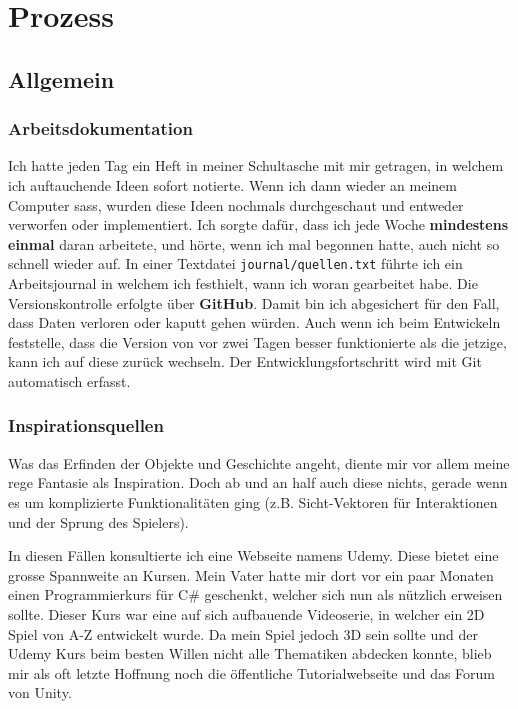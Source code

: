 \chapter{Prozess}

\section{Allgemein}

\subsection{Arbeitsdokumentation} 

Ich hatte jeden Tag ein Heft in meiner Schultasche mit mir getragen, in welchem ich auftauchende Ideen sofort notierte.
Wenn ich dann wieder an meinem Computer sass, wurden diese Ideen nochmals durchgeschaut und entweder verworfen oder implementiert.
Ich sorgte dafür, dass ich jede Woche \textbf{mindestens einmal} daran arbeitete, und hörte, wenn ich mal begonnen hatte, auch nicht so schnell wieder auf.
In einer Textdatei \lstinline{journal/quellen.txt} führte ich ein Arbeitsjournal in welchem ich festhielt, wann ich woran gearbeitet habe.
Die Versionskontrolle erfolgte über \textbf{GitHub}. Damit bin ich abgesichert für den Fall, dass Daten verloren oder kaputt gehen würden. Auch wenn ich beim Entwickeln feststelle, dass die Version von vor zwei Tagen besser funktionierte als die jetzige, kann ich auf diese zurück wechseln.
Der Entwicklungsfortschritt wird mit Git automatisch erfasst.

\subsection{Inspirationsquellen}
Was das Erfinden der Objekte und Geschichte angeht, diente mir vor allem meine rege Fantasie als Inspiration.
Doch ab und an half auch diese nichts, gerade wenn es um komplizierte Funktionalitäten ging (z.B. Sicht-Vektoren für Interaktionen und der Sprung des Spielers).

In diesen Fällen konsultierte ich eine Webseite namens Udemy. Diese bietet eine grosse Spannweite an Kursen. Mein Vater hatte mir dort vor ein paar Monaten einen Programmierkurs für C\# geschenkt, welcher sich nun als nützlich erweisen sollte.
Dieser Kurs war eine auf sich aufbauende Videoserie, in welcher ein 2D Spiel von A-Z entwickelt wurde.
Da mein Spiel jedoch 3D sein sollte und der Udemy Kurs beim besten Willen nicht alle Thematiken abdecken konnte, blieb mir als oft letzte Hoffnung noch die öffentliche Tutorialwebseite und das Forum von Unity. 


